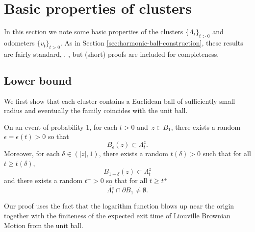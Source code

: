 \documentclass[12pt]{amsart}
\numberwithin{equation}{section}
\newcommand{\cluster}[2]{\hyperref[eq:non-co-set]{\mathit{\Lambda}^{#1}_{#2}}}
\newcommand{\odometer}[2]{\hyperref[eq:limit-odometer]{v^{#1}_{#2}}}
\begin{document}
	
	\section{Basic properties of clusters} \label{sec:basic-properties-cluster}
	
	In this section we note some basic properties of the clusters $\{{\cluster{}{t}}\}_{t > 0}$  and 
	odometers $\{\odometer{}{t}\}_{t > 0}$. As in Section \ref{sec:harmonic-ball-construction}, these results are fairly standard, \eg, \cite{sakai1984solutions, gustafsson1990onquadraturedomains, hedenmalm2002hele,shahgholian2013harmonic}, but (short) proofs are included for completeness. 
	
	
	\subsection{Lower bound}
	We first show that each cluster contains a Euclidean ball of sufficiently small radius and eventually the family 
	coincides with the unit ball. 
	\begin{prop} \label{prop:lower-bound}
		On an event of probability 1, for each $t > 0$ and~$z \in B_1$,  there exists a random $\epsilon = \epsilon(t) > 0$ so that 
		\begin{equation}
		B_{\epsilon}(z) \subset {\cluster{z}{t}}.
		\end{equation}
		Moreover, for each $\delta \in (|z|,1)$, there exists a random $t(\delta)>0$ such that for all $t \geq t(\delta)$,
		\begin{equation}
		B_{1-\delta}(z) \subset  {\cluster{z}{t}} 
		\end{equation}
		and there exists a random $t^+ > 0$ so that for all $t \geq t^+$
		\begin{equation}
		\overline{{{\cluster{z}{t}}}} \cap \partial B_1 \neq \emptyset.
		\end{equation}
	\end{prop}
	
	Our proof uses the fact that the logarithm function blows up near the origin together with 
	the finiteness of the expected exit time of Liouville Brownian Motion from the unit ball. 
	
\end{document}
